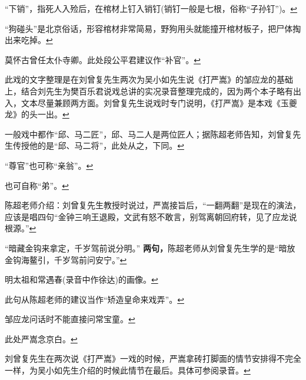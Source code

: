 \item
  \leavevmode\hypertarget{fn582}{}%
  ``下销''，指死人入殓后，在棺材上钉入销钉(销钉一般是七根，俗称``子孙钉'')。\protect\hyperlink{fnref582}{↩}
\item
  \leavevmode\hypertarget{fn583}{}%
  ``狗碰头''是北京俗话，形容棺材非常简易，野狗用头就能撞开棺材板子，把尸体掏出来吃掉。\protect\hyperlink{fnref583}{↩}
\item
  \leavevmode\hypertarget{fn584}{}%
  莫怀古曾任太仆寺卿。此处段公平君建议作``补官''。\protect\hyperlink{fnref584}{↩}
\item
  \leavevmode\hypertarget{fn585}{}%
  此戏的文字整理是在刘曾复先生两次为吴小如先生说《打严嵩》的邹应龙的基础上，结合刘先生为樊百乐君说戏总讲的实况录音整理完成的，因为两个本子略有出入，文本尽量兼顾两方面。刘曾复先生说戏时专门说明，《打严嵩》是本戏《玉夔龙》的头一出。\protect\hyperlink{fnref585}{↩}
\item
  \leavevmode\hypertarget{fn586}{}%
  一般戏中都作``邱、马二匠''，邱、马二人是两位匠人；据陈超老师告知，刘曾复先生传授他的是``邱、马二将''，此处从之，下同。\protect\hyperlink{fnref586}{↩}
\item
  \leavevmode\hypertarget{fn587}{}%
  ``尊官''也可称``亲翁''。\protect\hyperlink{fnref587}{↩}
\item
  \leavevmode\hypertarget{fn588}{}%
  也可自称``弟''。\protect\hyperlink{fnref588}{↩}
\item
  \leavevmode\hypertarget{fn589}{}%
  陈超老师介绍：刘曾复先生教授时说过，严嵩接旨后，``一翻两翻''是现在的演法，应该是唱四句``金钟三响王退殿，文武有怒不敢言，别驾离朝回府转，见了应龙说根源。''\protect\hyperlink{fnref589}{↩}
\item
  \leavevmode\hypertarget{fn590}{}%
  ``暗藏金钩来拿定，千岁驾前说分明。''
  \textbf{两句，}陈超老师从刘曾复先生学的是``暗放金钩海鳌引，千岁驾前问安宁。''\protect\hyperlink{fnref590}{↩}
\item
  \leavevmode\hypertarget{fn591}{}%
  明太祖和常遇春(录音中作徐达)的画像。\protect\hyperlink{fnref591}{↩}
\item
  \leavevmode\hypertarget{fn592}{}%
  此句从陈超老师的建议当作``矫造皇命来戏弄''。\protect\hyperlink{fnref592}{↩}
\item
  \leavevmode\hypertarget{fn593}{}%
  邹应龙问话时不能直接问常宝童。\protect\hyperlink{fnref593}{↩}
\item
  \leavevmode\hypertarget{fn594}{}%
  此处严嵩念京白。\protect\hyperlink{fnref594}{↩}
\item
  \leavevmode\hypertarget{fn595}{}%
  刘曾复先生在两次说《打严嵩》一戏的时候，严嵩拿砖打脚面的情节安排得不完全一样，为吴小如先生介绍的时候此情节在最后。具体可参阅录音。\protect\hyperlink{fnref595}{↩}
